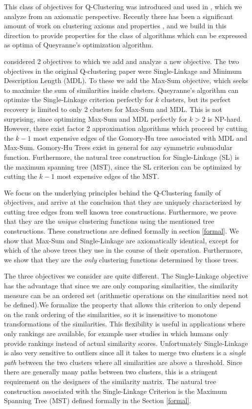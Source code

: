 \documentclass[twoside,11pt]{article}
\begin{document}
This class of objectives for Q-Clustering was introduced and used in \cite{qclustering}, which we analyze from an axiomatic perspective. Recently there has been a significant amount of work on clustering axioms and properties \citep{rita,bosagh2009,gunnar}, 
and we build in this direction to provide properties for the class of algorithms which can be expressed as optima of
Queyranne's optimization algorithm.


\cite{qclustering} considered 2 objectives to which we add and analyze a new objective. The two objectives
in the original Q-clustering paper were Single-Linkage and Minimum Description Length (MDL).
To these we add the Max-Sum objective, which seeks to maximize the sum of similarities inside clusters. 
Queyranne's algorithm can optimize the Single-Linkage criterion perfectly for $k$ clusters, but its
perfect recovery is limited to only 2 clusters for Max-Sum and MDL. This is not surprising, since optimizing
Max-Sum and MDL perfectly for $k>2$ is NP-hard. However, there exist factor 2 approximation algorithms
which proceed by cutting the $k-1$ most expensive edges of the Gomory-Hu tree \citep{gomoryhu} associated with 
MDL and Max-Sum. Gomory-Hu Trees exist in general for any symmetric submodular function. Furthermore, the
natural tree construction for Single-Linkage (SL) is the maximum spanning tree (MST), since the SL criterion
can be optimized by cutting the $k-1$ most expensive edges of the MST.

We focus on the underlying principles behind the Q-Clustering family of objectives, and arrive at the conclusion that
they are uniquely characterized by cutting tree edges from well known tree constructions. Furthermore, we prove that
they are the \textit{unique} clustering functions using the mentioned tree constructions. These constructions are defined formally in section \ref{formal}. We show that Max-Sum and Single-Linkage are axiomatically identical, except for which of the above trees they use in the course of their operation. Furthermore, we show that they are the \textit{only} clustering functions determined by those trees.

The three objectives we consider are quite different. The Single-Linkage objective has the advantage that since we are only comparing similarities,
the similarity measure can be an ordered set (arithmetic operations on the
similarities need not be defined).We formalize the property that allows this criterion to only depend 
on the rank ordering of the similarities, so it is
insensitive to monotone transformations of the similarities. This flexibility is useful in applications where only rankings
are available, for example user studies in which humans only provide rankings instead of actual similarity scores.
Unfortunately Single-Linkage is also very sensitive to outliers since all it takes to merge two clusters is a 
\textit{single path} between the two clusters where all similarities are above a threshold. Since there are generally many paths between
two clusters, this is a stringent requirement on the designers of the similarity matrix. The natural tree construction
associated with the Single-Linkage Criterion is the Maximum Spanning Tree (MST) defined formally in the Section \ref{formal}.
\end{document}
